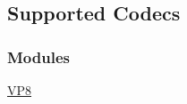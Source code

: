 \hypertarget{group__codecs}{\subsection{\-Supported \-Codecs}
\label{group__codecs}
}
\subsubsection*{\-Modules}
\begin{DoxyCompactItemize}
\item 
\hyperlink{group__vp8}{\-V\-P8}
\end{DoxyCompactItemize}
